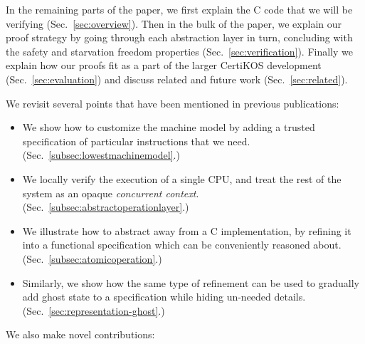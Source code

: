 In the remaining parts of the paper, we first explain the C code that we will be verifying (Sec.~\ref{sec:overview}).
Then in the bulk of the paper, we explain our proof strategy by going through each abstraction layer in turn, concluding with the safety and starvation freedom properties (Sec.~\ref{sec:verification}). Finally we explain how our proofs fit as a part of the larger CertiKOS development (Sec.~\ref{sec:evaluation}) and discuss related and future work (Sec.~\ref{sec:related}).

We revisit several points that have been mentioned in previous publications:

\begin{itemize}
\item We show how to customize the machine model by adding a trusted specification of particular instructions that we need. (Sec.~\ref{subsec:lowestmachinemodel}.)

\item We locally verify the execution of a single CPU, and treat the rest of the system as an opaque \emph{concurrent context}. (Sec.~\ref{subsec:abstractoperationlayer}.)

\item We illustrate how to abstract away from a C implementation, by refining it into a functional specification which can be conveniently reasoned about. (Sec.~\ref{subsec:atomicoperation}.)

\item Similarly, we show how the same type of refinement can be used to gradually add ghost state to a specification while hiding un-needed details. (Sec.~\ref{sec:representation-ghost}.)

\end{itemize}

We also make novel contributions:


